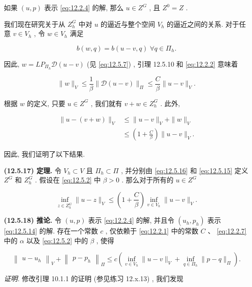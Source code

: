 如果 $(u, p)$ 表示 \eqref{eq:12.2.4} 的解, 那么 $u \in  {Z}^{G}$ , 且 ${Z}^{0} = Z$ .

我们现在研究关于从 ${Z}_{h}^{G}$ 中对 $u$ 的逼近与整个空间 ${V}_{h}$ 的逼近之间的关系. 对于任意 $v \in  {V}_{h}$ , 令 $w \in  {V}_{h}$ 满足

$$
b\left( {w,q}\right)  = b\left( {u - v,q}\right) \;\forall q \in  {\varPi }_{h}.
$$

因此, $w = L{P}_{{\varPi }_{h}}\mathcal{D}\left( {u - v}\right)$ (见 \eqref{eq:12.5.7}) , 引理 12.5.10 和 \eqref{eq:12.2.2} 意味着

$$
\| w\|_{V} \leq  \frac{1}{\beta }\| \mathcal{D}\left( {u - v}\right) \|_{\varPi } \leq  \frac{C}{\beta }\| u - v\|_{V}.
$$

根据 $w$ 的定义, 只要 $u \in  {Z}^{G}$ , 我们就有 $v + w \in  {Z}_{h}^{G}$ . 此外,

\begin{align*}
\| u - \left( {v + w}\right) \|_{V} &\leq  \| u - v\|_{V} + \| w\|_{V} \\
&\leq  \left( {1 + \frac{C}{\beta }}\right) \| u - v\|_{V}.
\end{align*}

因此, 我们证明了以下结果.

\textbf{(12.5.17) 定理.} 令 ${V}_{h} \subset  V$ 且 ${\varPi }_{h} \subset  \varPi$ , 并分别由 \eqref{eq:12.5.16} 和 \eqref{eq:12.5.15} 定义 ${Z}^{G}$ 和 ${Z}_{h}^{G}$ . 假设在 \eqref{eq:12.5.2} 中 $\beta  > 0$ . 那么对于所有的 $u \in  {Z}^{G}$

$$
\mathop{\inf }\limits_{{z \in  {Z}_{h}^{G}}}\| u - z\|_{V} \leq  \left( {1 + \frac{C}{\beta }}\right) \mathop{\inf }\limits_{{v \in  {V}_{h}}}\| u - v\|_{V}.
$$

\textbf{(12.5.18) 推论.} 令 $(u, p)$ 表示 \eqref{eq:12.2.4} 的解, 并且令 $\left( {{u}_{h},{p}_{h}}\right)$ 表示 \eqref{eq:12.5.14} 的解. 存在一个常数 $c$ , 仅依赖于 \eqref{eq:12.2.1} 中的常数 $C$ 、 \eqref{eq:12.2.7} 中的 $\alpha$ 以及 \eqref{eq:12.5.2} 中的 $\beta$ , 使得

$$
{\begin{Vmatrix}u - {u}_{h}\end{Vmatrix}}_{V} + {\begin{Vmatrix}p - {p}_{h}\end{Vmatrix}}_{\varPi } \leq  c\left( {\mathop{\inf }\limits_{{v \in  {V}_{h}}}\| u - v\|_{V} + \mathop{\inf }\limits_{{q \in  {\varPi }_{h}}}\| p - q\|_{\varPi }}\right) .
$$

\textit{证明.} 修改引理 10.1.1 的证明 (参见练习 12.x.13) , 我们发现

